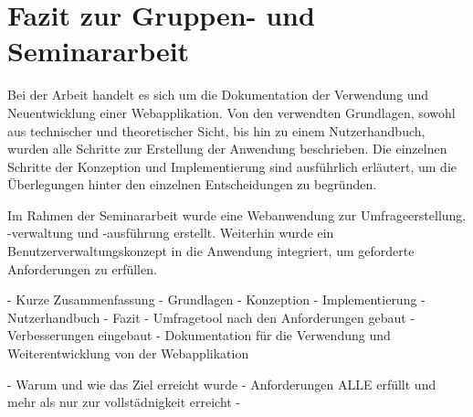 \section{Fazit zur Gruppen- und Seminararbeit}
\label{sec:Fazit}

Bei der Arbeit handelt es sich um die Dokumentation der Verwendung und Neuentwicklung einer Webapplikation. 
Von den verwendten Grundlagen, sowohl aus technischer und theoretischer Sicht, bis hin zu einem Nutzerhandbuch, wurden alle Schritte zur Erstellung der Anwendung beschrieben. 
Die einzelnen Schritte der Konzeption und Implementierung sind ausführlich erläutert, um die Überlegungen hinter den einzelnen Entscheidungen zu begründen. 


Im Rahmen der Seminararbeit wurde eine Webanwendung zur Umfrageerstellung, -verwaltung und -ausführung erstellt.
Weiterhin wurde ein Benutzerverwaltungskonzept in die Anwendung integriert, um geforderte Anforderungen zu erfüllen.

- Kurze Zusammenfassung
    - Grundlagen - Konzeption - Implementierung - Nutzerhandbuch - Fazit
    - Umfragetool nach den Anforderungen gebaut
    - Verbesserungen eingebaut
    - Dokumentation für die Verwendung und Weiterentwicklung von der Webapplikation

- Warum und wie das Ziel erreicht wurde
    - Anforderungen ALLE erfüllt und mehr als nur zur vollstädnigkeit erreicht
    - 